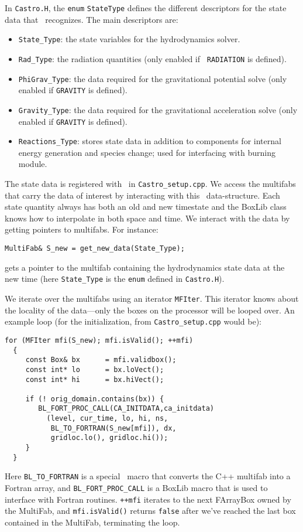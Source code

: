 In {\tt Castro.H}, the {\tt enum} {\tt StateType} defines the
different descriptors for the state data that \castro\ recognizes.
The main descriptors are:
\begin{itemize}
\item {\tt State\_Type}: the state variables for the hydrodynamics solver.

\item {\tt Rad\_Type}: the radiation quantities (only enabled if {\tt
  RADIATION} is defined).

\item {\tt PhiGrav\_Type}: the data required for the gravitational potential solve (only
  enabled if {\tt GRAVITY} is defined).  
  
\item {\tt Gravity\_Type}: the data required for the gravitational acceleration solve (only
  enabled if {\tt GRAVITY} is defined).

\item {\tt Reactions\_Type}: stores state data in addition to components
  for internal energy generation and species change; used for interfacing
  with burning module.
\end{itemize}

The state data is registered with \boxlib\ in {\tt Castro\_setup.cpp}.
We access the multifabs that carry the data of interest by interacting
with this \boxlib\ data-structure.  Each state quantity always has both
an old and new timestate and the BoxLib class knows how to interpolate
in both space and time.  We interact with the data by getting pointers
to multifabs.  For instance:
\begin{lstlisting}
MultiFab& S_new = get_new_data(State_Type);
\end{lstlisting}
gets a pointer to the multifab containing the hydrodynamics state data
at the new time (here {\tt State\_Type} is the {\tt enum} defined in 
{\tt Castro.H}).

We iterate over the multifabs using an iterator {\tt MFIter}.  This
iterator knows about the locality of the data---only the boxes on the
processor will be looped over.  An example loop (for the
initialization, from {\tt Castro\_setup.cpp} would be):
\begin{lstlisting}
for (MFIter mfi(S_new); mfi.isValid(); ++mfi)
  {
     const Box& bx      = mfi.validbox();
     const int* lo      = bx.loVect();
     const int* hi      = bx.hiVect();

     if (! orig_domain.contains(bx)) {
        BL_FORT_PROC_CALL(CA_INITDATA,ca_initdata)
          (level, cur_time, lo, hi, ns,
           BL_TO_FORTRAN(S_new[mfi]), dx,
           gridloc.lo(), gridloc.hi());
     }
  }
\end{lstlisting}
Here {\tt BL\_TO\_FORTRAN} is a special \boxlib\ macro that converts the
C++ multifab into a Fortran array, and {\tt BL\_FORT\_PROC\_CALL}
is a BoxLib macro that is used to interface with Fortran routines. 
{\tt ++mfi} iterates to the next FArrayBox owned by the MultiFab, 
and {\tt mfi.isValid()} returns {\tt false} after we've reached 
the last box contained in the MultiFab, terminating the loop.


